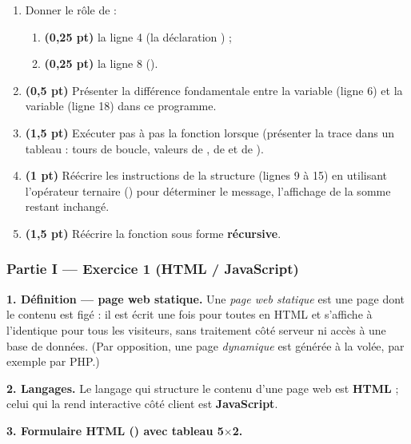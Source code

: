 \begin{enumerate}[label=\textbf{\arabic*.}]
\item Donner le rôle de :
  \begin{enumerate}[label=\textbf{1.\arabic*}]
  \item \textbf{(0,25 pt)} la ligne 4 (la déclaration
  ) ;
  \item \textbf{(0,25 pt)} la ligne 8 ().
  \end{enumerate}
\item \textbf{(0,5 pt)} Présenter la différence fondamentale entre la variable
 (ligne 6) et la variable  (ligne 18) dans ce programme.
\item \textbf{(1,5 pt)} Exécuter pas à pas la fonction 
lorsque  (présenter la trace dans un tableau : tours de boucle,
valeurs de , de  et de ).
\item \textbf{(1 pt)} Réécrire les instructions de la structure 
(lignes 9 à 15) en utilisant l'opérateur ternaire () pour déterminer
le message, l'affichage de la somme restant inchangé.
\item \textbf{(1,5 pt)} Réécrire la fonction  sous forme
\textbf{récursive}.
\end{enumerate}


\subsubsection*{Partie I — Exercice 1 (HTML / JavaScript)}

\textbf{1. Définition — page web statique.} Une \emph{page web statique} est une
page dont le contenu est figé : il est écrit une fois pour toutes en HTML et
s'affiche à l'identique pour tous les visiteurs, sans traitement côté serveur ni
accès à une base de données. (Par opposition, une page \emph{dynamique} est
générée à la volée, par exemple par PHP.)

\medskip
\textbf{2. Langages.} Le langage qui structure le contenu d'une page web est
\textbf{HTML} ; celui qui la rend interactive côté client est \textbf{JavaScript}.

\medskip
\textbf{3. Formulaire HTML () avec tableau 5$\times$2.}

